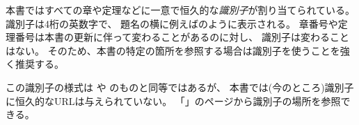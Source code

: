 \documentclass[index]{subfiles}
\begin{document}

本書ではすべての章や定理などに一意で恒久的な\emph{識別子}が割り当てられている。
識別子は4桁の英数字で、
題名の横に例えばのように表示される。
章番号や定理番号は本書の更新に伴って変わることがあるのに対し、
識別子は変わることはない。
そのため、本書の特定の箇所を参照する場合は識別子を使うことを強く推奨する。

この識別子の様式は
や
のものと同等ではあるが、
本書では(今のところ)識別子に恒久的なURLは与えられていない。
「\myLinkNodeIndex{}」のページから識別子の場所を参照できる。
\end{document}
